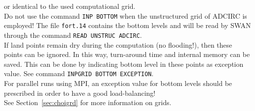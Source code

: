 \documentclass[12pt]{book}
\begin{document}
or identical to the used computational grid.
\\[2ex]
\noindent
Do not use the command {\tt INP BOTTOM} when the unstructured grid of ADCIRC is employed!
The file {\tt fort.14} contains the bottom levels and will be read by SWAN through the command {\tt READ UNSTRUC ADCIRC}.
\\[2ex]
\noindent
If land points remain dry during the computation (no flooding!), then these points can be ignored.
In this way, turn-around time and internal memory can be saved. This can be done by indicating bottom level in these points as
exception value. See command {\tt INPGRID BOTTOM EXCEPTION}.
\\[2ex]
\noindent
For parallel runs using MPI, an exception value for bottom levels should be prescribed in order
to have a good load-balancing!
\\[2ex]
\noindent
See Section~\ref{sec:choigrd} for more information on grids.
\end{document}

